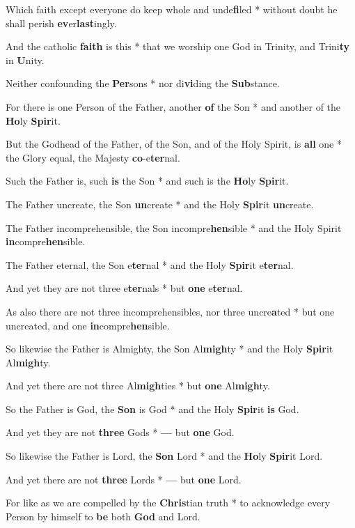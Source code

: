 \begin{multicols}{2}
	Which faith except everyone do keep whole and unde\textbf{fi}led * without doubt he shall perish \textbf{ev}er\textbf{last}ingly.
	
	And the catholic \textbf{faith} is this * that we worship one God in Trinity, and Trini\textbf{ty} in \textbf{U}nity.
	
	Neither confounding the \textbf{Per}sons * nor di\textbf{vi}ding the \textbf{Sub}stance.
	
	For there is one Person of the Father, another \textbf{of} the Son * and another of the \textbf{Ho}ly \textbf{Spir}it.
	
	But the Godhead of the Father, of the Son, and of the Holy Spirit, is \textbf{all} one * the Glory equal, the Majesty \textbf{co}-e\textbf{ter}nal.
	
	Such the Father is, such \textbf{is} the Son * and such is the \textbf{Ho}ly \textbf{Spir}it.
	
	The Father uncreate, the Son \textbf{un}create * and the Holy \textbf{Spir}it \textbf{un}create.
	
	The Father incomprehensible, the Son incompre\textbf{hen}sible * and the Holy Spirit \textbf{in}compre\textbf{hen}sible.
	
	The Father eternal, the Son e\textbf{ter}nal * and the Holy \textbf{Spir}it e\textbf{ter}nal.
	
	And yet they are not three e\textbf{ter}nals * but \textbf{one} e\textbf{ter}nal.
	
	As also there are not three incomprehensibles, nor three uncre\textbf{a}ted * but one uncreated, and one \textbf{in}compre\textbf{hen}sible.
	
	So likewise the Father is Almighty, the Son Al\textbf{migh}ty * and the Holy \textbf{Spir}it Al\textbf{migh}ty.
	
	And yet there are not three Al\textbf{migh}ties * but \textbf{one} Al\textbf{migh}ty.
	
	So the Father is God, the \textbf{Son} is God * and the Holy \textbf{Spir}it \textbf{is} God.
	
	And yet they are not \textbf{three} Gods * \textbf{---} but \textbf{one} God.
	
	So likewise the Father is Lord, the \textbf{Son} Lord * and the \textbf{Ho}ly \textbf{Spir}it Lord.
	
	And yet there are not \textbf{three} Lords * \textbf{---} but \textbf{one} Lord.
	
	For like as we are compelled by the \textbf{Chris}tian truth * to acknowledge every Person by himself to \textbf{be} both \textbf{God} and Lord.
	

\end{multicols}
